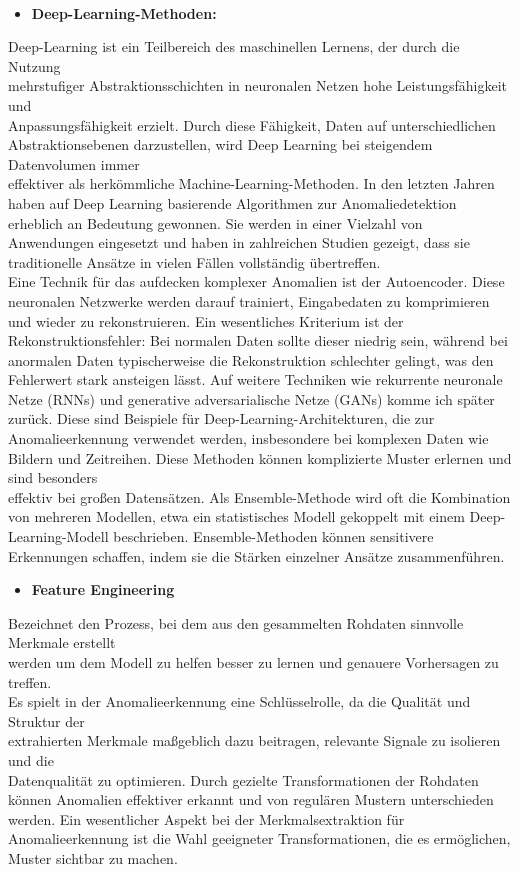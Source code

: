 \\
\begin{itemize} \item \textbf{Deep-Learning-Methoden:}\end{itemize} Deep-Learning ist ein Teilbereich des maschinellen Lernens, der durch die Nutzung \\ mehrstufiger Abstraktionsschichten in neuronalen Netzen hohe Leistungsfähigkeit und \\ Anpassungsfähigkeit erzielt. Durch diese Fähigkeit, Daten auf unterschiedlichen \\ Abstraktionsebenen darzustellen, wird Deep Learning bei steigendem Datenvolumen immer \\ effektiver als herkömmliche Machine-Learning-Methoden.
In den letzten Jahren haben auf Deep Learning basierende Algorithmen zur Anomaliedetektion erheblich an Bedeutung gewonnen. Sie werden in einer Vielzahl von Anwendungen eingesetzt und haben in zahlreichen Studien gezeigt, dass sie traditionelle Ansätze in vielen Fällen vollständig übertreffen\cite{Preprocessing}.
 \\ Eine Technik für das aufdecken komplexer Anomalien ist der Autoencoder. Diese neuronalen Netzwerke werden darauf trainiert, Eingabedaten zu komprimieren und wieder zu rekonstruieren. Ein wesentliches Kriterium ist der Rekonstruktionsfehler: Bei normalen Daten sollte dieser niedrig sein, während bei anormalen Daten typischerweise die Rekonstruktion schlechter gelingt, was den Fehlerwert stark ansteigen lässt\cite{FeatureAutoencoder}.
\nAbsatz
Auf weitere Techniken wie rekurrente neuronale Netze (RNNs) und generative adversarialische Netze (GANs) komme ich später zurück. Diese sind Beispiele für Deep-Learning-Architekturen, die zur Anomalieerkennung verwendet werden, insbesondere bei komplexen Daten wie Bildern und Zeitreihen. Diese Methoden können komplizierte Muster erlernen und sind besonders \\ effektiv bei großen Datensätzen.
Als Ensemble-Methode wird oft die Kombination von mehreren Modellen, etwa ein statistisches Modell gekoppelt mit einem Deep-Learning-Modell beschrieben. Ensemble-Methoden können sensitivere Erkennungen schaffen, indem sie die Stärken einzelner Ansätze zusammenführen.
\newpage
\begin{itemize} \item \textbf{Feature Engineering} \end{itemize} Bezeichnet den Prozess, bei dem aus den gesammelten Rohdaten sinnvolle Merkmale erstellt \\ werden um dem Modell zu helfen besser zu lernen und genauere Vorhersagen zu treffen\cite{FeatureAutoencoder}. \\ Es spielt in der Anomalieerkennung eine Schlüsselrolle, da die Qualität und Struktur der \\ extrahierten Merkmale maßgeblich dazu beitragen, relevante Signale zu isolieren und die \\ Datenqualität zu optimieren. Durch gezielte Transformationen der Rohdaten können Anomalien effektiver erkannt und von regulären Mustern unterschieden werden. Ein wesentlicher Aspekt bei der Merkmalsextraktion für Anomalieerkennung ist die Wahl geeigneter Transformationen, die es ermöglichen, Muster sichtbar zu machen.

